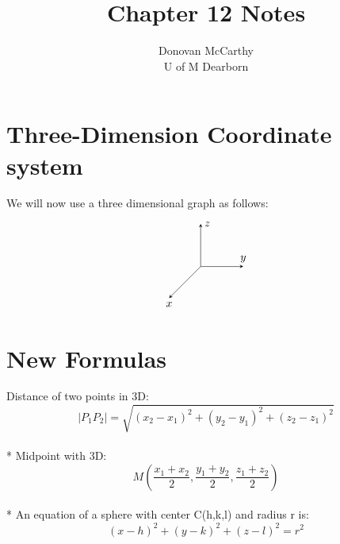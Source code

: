 \documentclass{article}
\title{\vspace{-4.0cm}Chapter 12 Notes}
\author{Donovan McCarthy\\ 
	U of M Dearborn }
\date
\begin{document}
\section*{\center Three-Dimension Coordinate system}
We will now use a three dimensional graph as follows:
\[
\begin{tikzpicture}[y=0.1cm,x=0.1cm,z=0.1cm,>=stealth]
\draw[->] (xyz cs:x=0) -- (xyz cs:x=13.5) node[above] {$y$}; 
\draw[->] (xyz cs:y=0) -- (xyz cs:y=13.5) node[right] {$z$};
\draw (xyz cs:z=-10) node[below] {$x$}[<-] -- (xyz cs:z=0) ;
\end{tikzpicture}
\]
\section*{\center  New Formulas}
Distance of two points in 3D:\quad 
\[
 |P_{1}P_{2}|= \sqrt{(x_{2}-x_{1})^{2} + (y_{2}-y_{1})^{2} + (z_{2}-z_{1})^{2} }
\]
\\*
Midpoint with 3D:\quad  
\[
M(\frac{x_{1} + x_{2}}{2},\frac{y_{1} + y_{2}}{2},\frac{z_{1} + z_{2}}{2})
\]
\\*
An equation of a sphere with center C(h,k,l) and radius r is: \quad
\[
(x-h)^{2}+(y-k)^{2}+(z-l)^{2}=r^{2} 
\]
\end{document}
